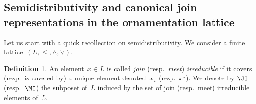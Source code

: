 \documentclass{amsart}
\newtheorem{corollary}[theorem]{Corollary}
\newtheorem{lemma}[theorem]{Lemma}
\theoremstyle{definition}
\newtheorem{definition}[theorem]{Definition}
\newcommand{\ssm}{\smallsetminus} %
\DeclareMathOperator{\tc}{tc} %
\newcommand{\darkblue}{\color{darkblue}} %
\newcommand{\defn}[1]{\textsl{\darkblue #1}} %
\newcommand{\meet}{\wedge} %
\newcommand{\join}{\vee} %
\newcommand{\mymap}[2]{\mathsf{#1}_{\hspace{-.7pt}#2}}
\newcommand{\reori}[1]{\mymap{R}{#1}}  %
\DeclareMathOperator{\rev}{rev} %
\newcommand{\PP}{\mathbb P} %
\begin{document}
%
%
%
%
%


\subsection{Semidistributivity and canonical join representations in the ornamentation lattice}
\label{subsec:semidistributivityT}

Let us start with a quick recollection on semidistributivity.
We consider a finite lattice~$(L, \le, \meet, \join)$.

\begin{definition}
An element~$x \in L$ is called \defn{join} (resp.~\defn{meet}) \defn{irreducible} if it covers (resp.~is covered by) a unique element denoted~$x_\star$ (resp.~$x^\star$).
We denote by $\JI$ (resp.~$\MI$) the subposet of~$L$ induced by the set of join (resp.~meet) irreducible elements of~$L$.
\end{definition}
\end{document}
